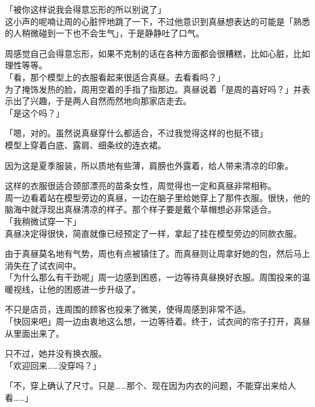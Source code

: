 「被你这样说我会得意忘形的所以别说了」\\

这小声的呢喃让周的心脏怦地跳了一下，不过他意识到真昼想表达的可能是「熟悉的人稍微碰到一下也不会生气」，于是静静吐了口气。

周感觉自己会得意忘形，如果不克制的话在各种方面都会很糟糕，比如心脏，比如理性等等。\\

「看，那个模型上的衣服看起来很适合真昼。去看看吗？」\\

为了掩饰发热的脸，周用空着的手指了指那边。真昼说着「是周的喜好吗？」并表示出了兴趣，于是两人自然而然地向那家店走去。\\

「是这个吗？」

「嗯，对的。虽然说真昼穿什么都适合，不过我觉得这样的也挺不错」\\

模型上穿着白底、露肩、细条纹的连衣裙。

因为这是夏季服装，所以质地有些薄，肩膀也外露着，给人带来清凉的印象。

这样的衣服很适合颈部漂亮的苗条女性，周觉得也一定和真昼非常相称。\\

周一边看着站在模型旁边的真昼，一边在脑子里给她穿上了那件衣服。很快，他的脑海中就浮现出真昼清凉的样子。那个样子要是戴个草帽想必非常适合。\\

「我稍微试穿一下」\\

真昼决定得很快，简直就像已经预定了一样，拿起了挂在模型旁边的同款衣服。

由于真昼莫名地有气势，周也有点被镇住了。而真昼则让周拿好她的包，然后马上消失在了试衣间中。\\

「为什么那么有干劲呢」周一边感到困惑，一边等待真昼换好衣服。周围投来的温暖视线，让他的困惑进一步升级了。

不只是店员，连周围的顾客也投来了微笑，使得周感到非常不适。\\

「快回来吧」周一边由衷地这么想，一边等待着。终于，试衣间的帘子打开，真昼从里面出来了。

只不过，她并没有换衣服。\\

「欢迎回来……没穿吗？」

「不，穿上确认了尺寸。只是……那个、现在因为内衣的问题，不能穿出来给人看……」

